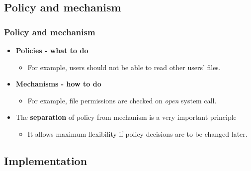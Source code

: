 \documentclass[CJKutf8,dvipsnames,table]{beamer}
\begin{document}
\begin{CJK*}{UTF8}{song}
  \subsection{Policy and mechanism}

  \begin{frame}
    \frametitle{Policy and mechanism} \pause
    \begin{itemize}
    \item \textbf{Policies \pause - what to do}  \pause
      \begin{itemize}
      \item For example, users should not be able to read other users' files.  \pause
      \end{itemize}
    \item \textbf{Mechanisms \pause - how to do}  \pause
      \begin{itemize}
      \item For example, file permissions are checked on \emph{open} system call.  \pause
      \end{itemize}
    \item The \textbf{separation} of policy from mechanism is a very important principle  \pause
      \begin{itemize}
      \item It allows maximum flexibility if policy decisions are to be changed later.  \pause
      \end{itemize}
    \end{itemize}
  \end{frame}

  \subsection{Implementation}
  

\end{CJK*}
\end{document}
